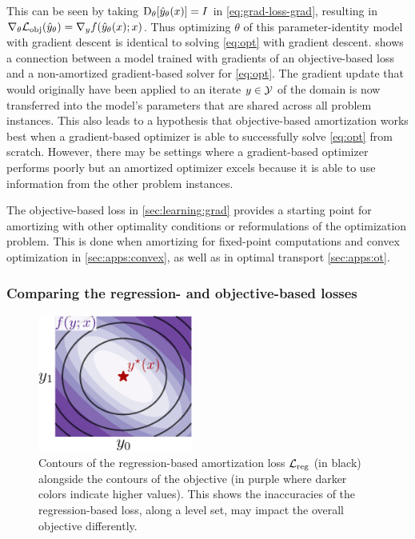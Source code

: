 This can be seen by taking $\mathrm{D}_\theta[\hat y_\theta(x)]=I$
in \cref{eq:grad-loss-grad}, resulting in
$\nabla_\theta {\mathcal{L}}_{\rm obj}(\hat y_\theta)=\nabla_y f(\hat y_\theta(x); x)$.
Thus optimizing $\theta$ of this parameter-identity model with gradient descent
is identical to solving \cref{eq:opt} with gradient descent.
 shows a connection between a model trained with
gradients of an objective-based loss and a non-amortized gradient-based
solver for \cref{eq:opt}.
The gradient update that would originally have been applied to an
iterate $y\in{\mathcal{Y}}$ of the domain is now transferred into the
model's parameters that are shared across all problem instances.
This also leads to a hypothesis that objective-based amortization
works best when a gradient-based optimizer is able to successfully
solve \cref{eq:opt} from scratch. However, there may be settings
where a gradient-based optimizer performs poorly but an amortized
optimizer excels because it is able to use information from the
other problem instances.

\begin{remark}
The objective-based loss in \cref{sec:learning:grad} provides a starting
point for amortizing with other optimality conditions or reformulations
of the optimization problem. This is done when amortizing for fixed-point
computations and convex optimization in \cref{sec:apps:convex}, as well as
in optimal transport \cref{sec:apps:ot}.
\label{rmk:optimality-loss}
\end{remark}

\subsubsection{Comparing the regression- and objective-based losses}
\begin{figure}[t]
\centering
\includegraphics[width=2in]{fig/loss-comp.pdf}
\caption{Contours of the regression-based amortization loss
  ${\mathcal{L}}_{\rm reg}$ (in black) alongside the contours of the objective
  (in purple where darker colors indicate higher values).
  This shows the inaccuracies of the regression-based loss, \eg
  along a level set, may impact the overall objective differently.
}
\label{fig:reg-contours}
\end{figure}

